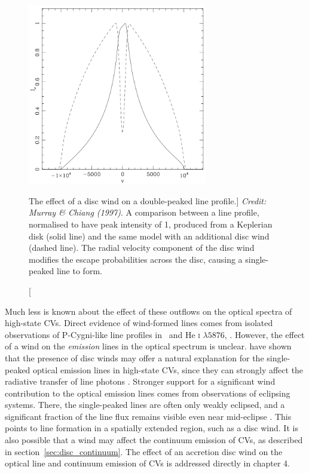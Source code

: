 \begin{figure}
\centering
\includegraphics[width=0.7\textwidth]{figures/02-outflows/mc_line.png}
\caption
[The effect of a disc wind on a double-peaked line profile.]
{
{\sl Credit: Murray \& Chiang (1997)}. 
A comparison between a line profile, normalised to have peak intensity of 1,
produced from a Keplerian disk (solid line) and the same model with an additional
disc wind (dashed line). The radial velocity component of the disc wind modifies
the escape probabilities across the disc, causing a single-peaked line to form.
} 
\label{fig:mc_line}
\end{figure}

Much less is known about the effect of these outflows on the optical
spectra of high-state CVs. Direct evidence of wind-formed lines comes from
isolated observations of P-Cygni-like line profiles in
\ha\ and He \textsc{i} $\lambda5876$, 
\citep{patterson1996, RN98, kafka2004}. 
However, the effect of a wind  on the {\em emission} lines in the optical 
spectrum is unclear.
\cite{MC96, MC97} have shown that the presence of disc winds may
offer a natural explanation for the single-peaked optical emission lines in
high-state CVs, since they can strongly affect the radiative transfer
of line photons \citep[Fig.~\ref{fig:mc_line}; also see][]{flohic2012}. 
Stronger support for a significant wind contribution to the
optical emission lines comes from observations of eclipsing
systems. There, the single-peaked lines are often only weakly
eclipsed, and a significant fraction of the line flux remains visible
even near mid-eclipse \citep[e.g.][]{baptista2000,groot2004}. 
This points to line formation in a spatially
extended region, such as a disc wind.
It is also possible that a wind may affect the continuum emission of CVs,
as described in section~\ref{sec:disc_continuum}. 
The effect of an accretion disc wind
on the optical line and continuum emission of CVs is addressed directly
in chapter 4.

